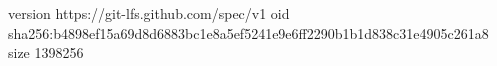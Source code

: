 version https://git-lfs.github.com/spec/v1
oid sha256:b4898ef15a69d8d6883bc1e8a5ef5241e9e6ff2290b1b1d838c31e4905c261a8
size 1398256
